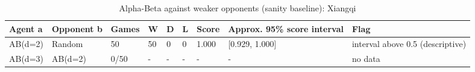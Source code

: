 \begin{table}[!t]
\centering
\caption{Alpha-Beta against weaker opponents (sanity baseline): Xiangqi}
\label{tab:ab_self_xiangqi}
\small
\begin{tabular}{lllllllll}
\toprule
Agent a & Opponent b & Games & W & D & L & Score & Approx. 95\% score interval & Flag \\
\midrule
AB(d=2) & Random & 50 & 50 & 0 & 0 & 1.000 & [0.929, 1.000] & interval above 0.5 (descriptive) \\
AB(d=3) & AB(d=2) & 0/50 & - & - & - & - & - & no data \\
\bottomrule
\end{tabular}
\end{table}
